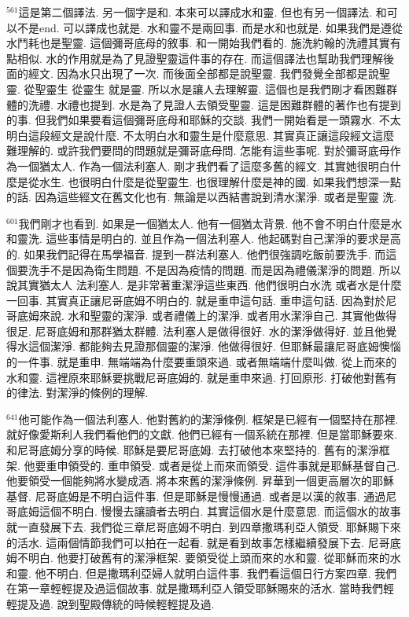 \documentclass{book}
\begin{document}
$^{561}$這是第二個譯法.
另一個字是和.
本來可以譯成水和靈.
但也有另一個譯法.
和可以不是end.
可以譯成也就是.
水和靈不是兩回事.
而是水和也就是.
如果我們是遵從水鬥耗也是聖靈.
這個彌哥底母的敘事.
和一開始我們看的.
施洗約翰的洗禮其實有點相似.
水的作用就是為了見證聖靈這件事的存在.
而這個譯法也幫助我們理解後面的經文.
因為水只出現了一次.
而後面全部都是說聖靈.
我們發覺全部都是說聖靈.
從聖靈生 從靈生 就是靈.
所以水是讓人去理解靈.
這個也是我們剛才看困難群體的洗禮.
水禮也提到.
水是為了見證人去領受聖靈.
這是困難群體的著作也有提到的事.
但我們如果要看這個彌哥底母和耶穌的交談.
我們一開始看是一頭霧水.
不太明白這段經文是說什麼.
不太明白水和靈生是什麼意思.
其實真正讓這段經文這麼難理解的.
或許我們要問的問題就是彌哥底母問.
怎能有這些事呢.
對於彌哥底母作為一個猶太人.
作為一個法利塞人.
剛才我們看了這麼多舊的經文.
其實她很明白什麼是從水生.
也很明白什麼是從聖靈生.
也很理解什麼是神的國.
如果我們想深一點的話.
因為這些經文在舊文化也有.
無論是以西結書說到清水潔淨.
或者是聖靈 洗.

$^{601}$我們剛才也看到.
如果是一個猶太人.
他有一個猶太背景.
他不會不明白什麼是水和靈洗.
這些事情是明白的.
並且作為一個法利塞人.
他起碼對自己潔淨的要求是高的.
如果我們記得在馬學福音.
提到一群法利塞人.
他們很強調吃飯前要洗手.
而這個要洗手不是因為衛生問題.
不是因為疫情的問題.
而是因為禮儀潔淨的問題.
所以說其實猶太人 法利塞人.
是非常著重潔淨這些東西.
他們很明白水洗 或者水是什麼一回事.
其實真正讓尼哥底姆不明白的.
就是重申這句話.
重申這句話.
因為對於尼哥底姆來說.
水和聖靈的潔淨.
或者禮儀上的潔淨.
或者用水潔淨自己.
其實他做得很足.
尼哥底姆和那群猶太群體.
法利塞人是做得很好.
水的潔淨做得好.
並且他覺得水這個潔淨.
都能夠去見證那個靈的潔淨.
他做得很好.
但耶穌最讓尼哥底姆懊惱的一件事.
就是重申.
無端端為什麼要重頭來過.
或者無端端什麼叫做.
從上而來的水和靈.
這裡原來耶穌要挑戰尼哥底姆的.
就是重申來過.
打回原形.
打破他對舊有的律法.
對潔淨的條例的理解.

$^{641}$他可能作為一個法利塞人.
他對舊約的潔淨條例.
框架是已經有一個堅持在那裡.
就好像愛斯利人我們看他們的文獻.
他們已經有一個系統在那裡.
但是當耶穌要來.
和尼哥底姆分享的時候.
耶穌是要尼哥底姆.
去打破他本來堅持的.
舊有的潔淨框架.
他要重申領受的.
重申領受.
或者是從上而來而領受.
這件事就是耶穌基督自己.
他要領受一個能夠將水變成酒.
將本來舊的潔淨條例.
昇華到一個更高層次的耶穌基督.
尼哥底姆是不明白這件事.
但是耶穌是慢慢通過.
或者是以漢的敘事.
通過尼哥底姆這個不明白.
慢慢去讓讀者去明白.
其實這個水是什麼意思.
而這個水的故事就一直發展下去.
我們從三章尼哥底姆不明白.
到四章撒瑪利亞人領受.
耶穌賜下來的活水.
這兩個情節我們可以拍在一起看.
就是看到故事怎樣繼續發展下去.
尼哥底姆不明白.
他要打破舊有的潔淨框架.
要領受從上頭而來的水和靈.
從耶穌而來的水和靈.
他不明白.
但是撒瑪利亞婦人就明白這件事.
我們看這個日行方案四章.
我們在第一章輕輕提及過這個故事.
就是撒瑪利亞人領受耶穌賜來的活水.
當時我們輕輕提及過.
說到聖殿傳統的時候輕輕提及過.
\end{document}
